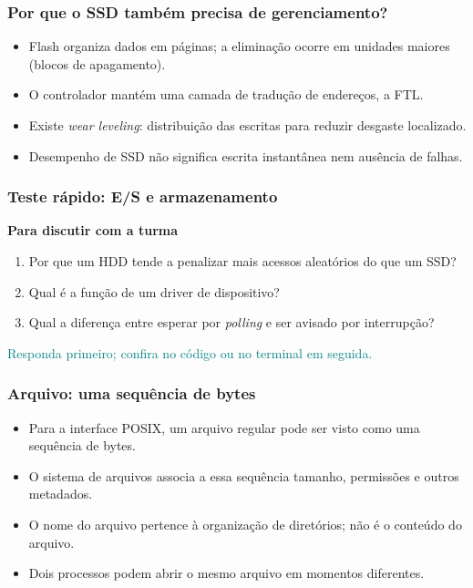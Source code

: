 \documentclass[aspectratio=169,11pt]{beamer}
\begin{document}
\begin{frame}
\frametitle{Por que o SSD também precisa de gerenciamento?}
\large
\begin{itemize}
\item Flash organiza dados em páginas; a eliminação ocorre em unidades maiores (blocos de apagamento).
\item O controlador mantém uma camada de tradução de endereços, a FTL.
\item Existe \textit{wear leveling}: distribuição das escritas para reduzir desgaste localizado.
\item Desempenho de SSD não significa escrita instantânea nem ausência de falhas.
\end{itemize}

\end{frame}

\begin{frame}
\frametitle{Teste rápido: E/S e armazenamento}
{\large\textbf{Para discutir com a turma}}\par\medskip\begin{enumerate}\item Por que um HDD tende a penalizar mais acessos aleatórios do que um SSD?
\item Qual é a função de um driver de dispositivo?
\item Qual a diferença entre esperar por \textit{polling} e ser avisado por interrupção?
\end{enumerate}\vfill\textcolor{teal}{\footnotesize Responda primeiro; confira no código ou no terminal em seguida.}
\end{frame}

\begin{frame}
\frametitle{Arquivo: uma sequência de bytes}
\large
\begin{itemize}
\item Para a interface POSIX, um arquivo regular pode ser visto como uma sequência de bytes.
\item O sistema de arquivos associa a essa sequência tamanho, permissões e outros metadados.
\item O nome do arquivo pertence à organização de diretórios; não é o conteúdo do arquivo.
\item Dois processos podem abrir o mesmo arquivo em momentos diferentes.
\end{itemize}

\end{frame}
\end{document}
